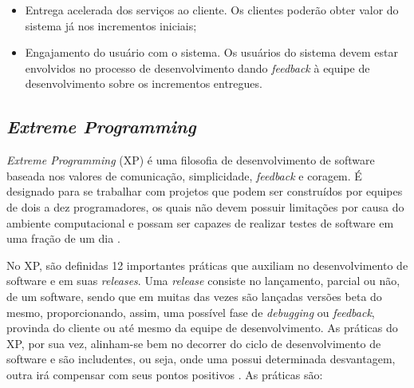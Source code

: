 \begin{itemize}
    \item Entrega acelerada dos serviços ao cliente. Os clientes poderão obter valor do sistema já nos incrementos iniciais;
    \item Engajamento do usuário com o sistema. Os usuários do sistema devem estar envolvidos no processo
    de desenvolvimento dando \textit{feedback} à equipe de desenvolvimento sobre os incrementos entregues.
\end{itemize}

    \subsection{\textit{Extreme Programming}}
    \textit{Extreme Programming} (XP) é uma filosofia de desenvolvimento de software baseada nos valores de comunicação, simplicidade, \textit{feedback} e coragem. É designado para se trabalhar com projetos que podem ser
    construídos por equipes de dois a dez programadores, os quais não devem possuir limitações
    por causa do ambiente computacional e possam ser capazes de realizar testes de
    software em uma fração de um dia \cite{beck_2004}.

    No XP, são definidas 12 importantes práticas que auxiliam no
    desenvolvimento de software e em suas \textit{releases}.
    Uma \textit{release} consiste no lançamento, parcial ou não,
    de um software, sendo que em muitas das vezes são
    lançadas versões beta do mesmo, proporcionando, assim, uma possível
    fase de \textit{debugging} ou \textit{feedback}, provinda do
    cliente ou até mesmo da equipe de desenvolvimento. As práticas do XP, por sua vez, alinham-se bem no decorrer do ciclo de desenvolvimento de software e são includentes, ou seja, onde uma possui determinada desvantagem, outra
    irá compensar com seus pontos positivos \cite{beck_2004}. As práticas são:

